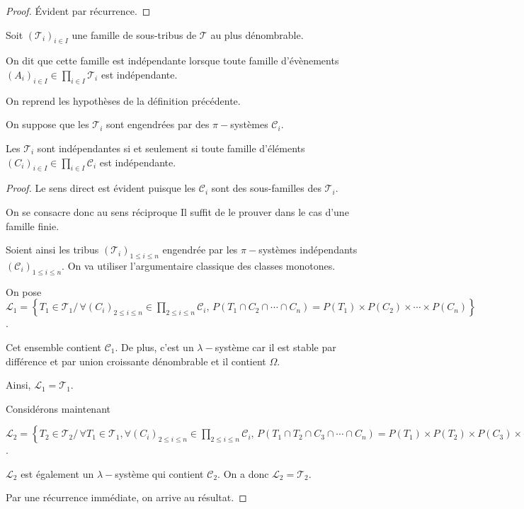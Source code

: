 \begin{proof}
Évident par récurrence.
\end{proof}

\begin{de}
Soit $\left(\mathcal{T}_i\right)_{i \in I}$ une famille de sous-tribus de $\mathcal{T}$ au plus dénombrable.

On dit que cette famille est indépendante lorsque toute famille d'évènements $(A_i)_{i \in I} \in \displaystyle{\prod \limits_{i \in I}} \mathcal{T}_i$ est indépendante.
\end{de}

\begin{prop}
\label{classes_monotones_independance}
On reprend les hypothèses de la définition précédente.

On suppose que les $\mathcal{T}_i$ sont engendrées par des $\pi-$systèmes $\mathcal{C}_i$.

Les $\mathcal{T}_i$ sont indépendantes si et seulement si toute famille d'éléments  $(C_i)_{i \in I} \in \displaystyle{\prod \limits_{i \in I}} \mathcal{C}_i$ est indépendante.
\end{prop}


\begin{proof}
Le sens direct est évident puisque les $\mathcal{C}_i$ sont des sous-familles des $\mathcal{T}_i$. 

On se consacre donc au sens réciproque Il suffit de le prouver dans le cas d'une famille finie. 

Soient ainsi les tribus $\left(\mathcal{T}_i\right)_{1 \leq i \leq n}$ engendrée par les $\pi-$systèmes indépendants $\left(\mathcal{C}_i\right)_{1 \leq i \leq n}$. On va utiliser l'argumentaire classique des classes monotones.

On pose $\mathcal{L}_1 = \left \{ T_1 \in \mathcal{T}_1 / \, \forall \left(C_i\right)_{2 \leq i \leq n} \in \displaystyle{\prod \limits_{2 \leq i \leq n}} \mathcal{C}_i, \, P\left(T_1 \cap C_2 \cap \cdots \cap C_n\right) =  P(T_1) \times P(C_2) \times \cdots \times P(C_n) \right \}$.

Cet ensemble contient $\mathcal{C}_1$. De plus, c'est un $\lambda-$système car il est stable par différence et par union croissante dénombrable et il contient $\Omega$.

Ainsi, $\mathcal{L}_1 = \mathcal{T}_1$.

Considérons maintenant 

$\mathcal{L}_2 = \left \{ T_2 \in \mathcal{T}_2 / \, \forall T_1 \in \mathcal{T}_1, \forall \left(C_i\right)_{2 \leq i \leq n} \in \displaystyle{\prod \limits_{2 \leq i \leq n}} \mathcal{C}_i, \, P(T_1 \cap T_2 \cap C_3 \cap \cdots \cap C_n) =  P(T_1) \times P(T_2) \times P(C_3) \times \cdots \times P(C_n) \right \}$.

$\mathcal{L}_2$ est également un $\lambda-$système qui contient $\mathcal{C}_2$. On a donc $\mathcal{L}_2 = \mathcal{T}_2$.

Par une récurrence immédiate, on arrive au résultat.
\end{proof}

